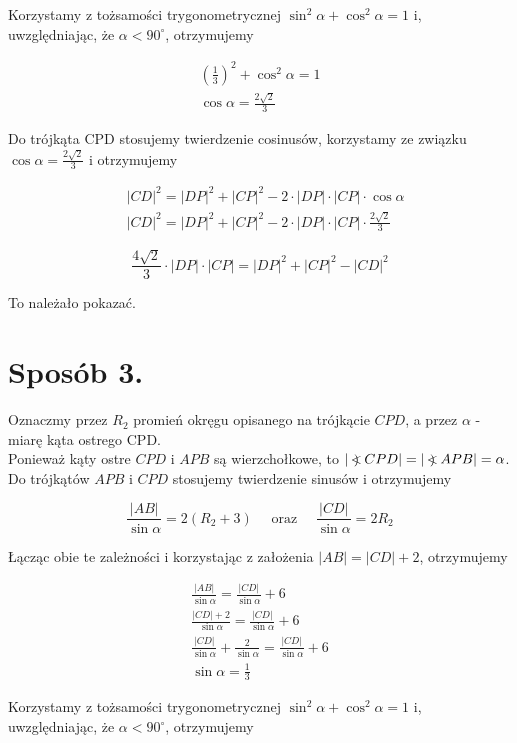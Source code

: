 \documentclass[10pt]{article}
\newcommand\Varangle{\mathop{{<\!\!\!\!\!\text{\small)}}\:}\nolimits}
\begin{document}
Korzystamy z tożsamości trygonometrycznej $\sin ^{2} \alpha+\cos ^{2} \alpha=1$ i, uwzględniając, że $\alpha<90^{\circ}$, otrzymujemy

$$
\begin{gathered}
\left(\frac{1}{3}\right)^{2}+\cos ^{2} \alpha=1 \\
\cos \alpha=\frac{2 \sqrt{2}}{3}
\end{gathered}
$$

Do trójkąta CPD stosujemy twierdzenie cosinusów, korzystamy ze związku $\cos \alpha=\frac{2 \sqrt{2}}{3}$ i otrzymujemy

$$
\begin{aligned}
& |C D|^{2}=|D P|^{2}+|C P|^{2}-2 \cdot|D P| \cdot|C P| \cdot \cos \alpha \\
& |C D|^{2}=|D P|^{2}+|C P|^{2}-2 \cdot|D P| \cdot|C P| \cdot \frac{2 \sqrt{2}}{3}
\end{aligned}
$$

$$
\frac{4 \sqrt{2}}{3} \cdot|D P| \cdot|C P|=|D P|^{2}+|C P|^{2}-|C D|^{2}
$$

To należało pokazać.

\section*{Sposób 3.}
Oznaczmy przez $R_{2}$ promień okręgu opisanego na trójkącie $C P D$, a przez $\alpha$ - miarę kąta ostrego CPD.\\
Ponieważ kąty ostre $C P D$ i $A P B$ są wierzchołkowe, to $|\Varangle C P D|=|\Varangle A P B|=\alpha$.\\
Do trójkątów $A P B$ i $C P D$ stosujemy twierdzenie sinusów i otrzymujemy

$$
\frac{|A B|}{\sin \alpha}=2\left(R_{2}+3\right) \quad \text { oraz } \quad \frac{|C D|}{\sin \alpha}=2 R_{2}
$$

Łącząc obie te zależności i korzystając z założenia $|A B|=|C D|+2$, otrzymujemy

$$
\begin{gathered}
\frac{|A B|}{\sin \alpha}=\frac{|C D|}{\sin \alpha}+6 \\
\frac{|C D|+2}{\sin \alpha}=\frac{|C D|}{\sin \alpha}+6 \\
\frac{|C D|}{\sin \alpha}+\frac{2}{\sin \alpha}=\frac{|C D|}{\sin \alpha}+6 \\
\sin \alpha=\frac{1}{3}
\end{gathered}
$$

Korzystamy z tożsamości trygonometrycznej $\sin ^{2} \alpha+\cos ^{2} \alpha=1$ i, uwzględniając, że $\alpha<90^{\circ}$, otrzymujemy
\end{document}

